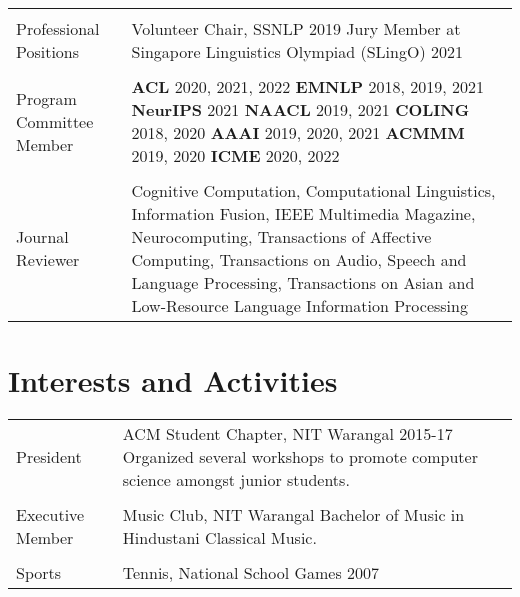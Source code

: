 \documentclass[a4paper,10pt]{article}
\begin{document}
\begin{tabular}{R{2cm}| L{11cm}}

  \\
 Professional Positions & Volunteer Chair, SSNLP 2019 \newline Jury Member at Singapore Linguistics Olympiad (SLingO) 2021 \\
  \\
 Program Committee Member & \textbf{ACL} 2020, 2021, 2022 \newline \textbf{EMNLP} 2018, 2019, 2021 \newline \textbf{NeurIPS} 2021 \newline \textbf{NAACL} 2019, 2021 \newline \textbf{COLING} 2018, 2020 \newline \textbf{AAAI} 2019, 2020, 2021 \newline \textbf{ACMMM} 2019, 2020 \newline \textbf{ICME} 2020, 2022 \\
  \\
 Journal Reviewer & Cognitive Computation, \newline
 Computational Linguistics, \newline 
 Information Fusion, \newline
 IEEE Multimedia Magazine, \newline
 Neurocomputing, \newline
 Transactions of Affective Computing, \newline
 Transactions on Audio, Speech and Language Processing, \newline 
 Transactions on Asian and Low-Resource Language Information Processing\\
\end{tabular}


\section{Interests and Activities}

\begin{tabular}{R{2cm}| L{11cm}}
    President & ACM Student Chapter, NIT Warangal 2015-17 \newline Organized several workshops to promote computer science amongst junior students. \\
     \\
    Executive Member & Music Club, NIT Warangal \newline 
    Bachelor of Music in Hindustani Classical Music. \\
     \\
    Sports &  
    Tennis, National School Games 2007 \\
\end{tabular}
\end{document}
